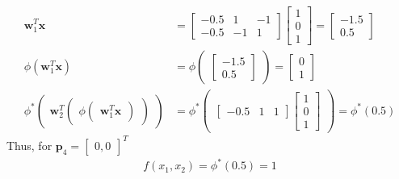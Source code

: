 \begin{align*}
  \textbf{w}_1^T\textbf{x} &= \begin{bmatrix}
    -0.5 & 1 & -1 \\
    -0.5 & -1 & 1 
  \end{bmatrix} \begin{bmatrix}
    1\\
    0 \\
    1
  \end{bmatrix} = \begin{bmatrix}
    -1.5 \\
    0.5
  \end{bmatrix} \\
  \phi(\textbf{w}_1^T\textbf{x}) &= \phi\begin{pmatrix}
    \begin{bmatrix}
      -1.5 \\
      0.5
    \end{bmatrix}
  \end{pmatrix} = \begin{bmatrix}
    0 \\
    1
  \end{bmatrix} \\
  \phi^{*} \begin{pmatrix}
    \textbf{w}_2^T 
    \begin{pmatrix}
      \phi \begin{pmatrix}
        \textbf{w}_1^T\textbf{x}
    \end{pmatrix}  
  \end{pmatrix}
  \end{pmatrix} &= \phi^{*}\begin{pmatrix}
    \begin{bmatrix}
      -0.5 & 1 & 1
    \end{bmatrix} \begin{bmatrix}
      1 \\ 
      0 \\
      1
    \end{bmatrix}
  \end{pmatrix} = \phi^{*}(0.5)
\end{align*}
Thus, for $\textbf{p}_4 = \begin{bmatrix}
  0,0
\end{bmatrix}^T$
\begin{align*}
  f(x_1,x_2) = \phi^{*} (0.5) = 1
\end{align*}
